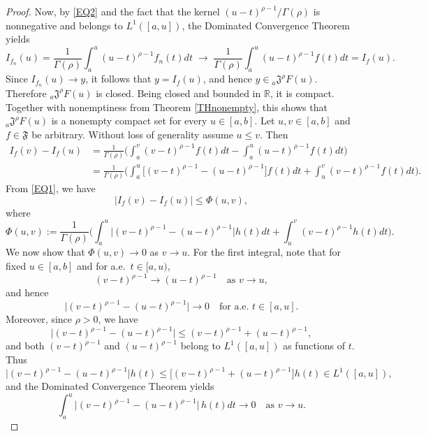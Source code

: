 \documentclass[10pt,a4paper]{amsart}
\begin{document}
\begin{proof}
Now, by \eqref{EQ2} and the fact that the kernel 
$(u-t)^{\rho-1}/\Gamma(\rho)$ is nonnegative and belongs to $L^{1}([a,u])$,
the Dominated Convergence Theorem yields
\[
I_{f_n}(u)
=
\frac{1}{\Gamma(\rho)}\int_{a}^{u}(u-t)^{\rho-1}f_n(t)dt
\;\longrightarrow\;
\frac{1}{\Gamma(\rho)}\int_{a}^{u}(u-t)^{\rho-1}f(t)dt
=
I_f(u).
\]
Since $I_{f_n}(u)\to y$, it follows that $y=I_f(u)$, and hence  $y\in{}_{a}\mathfrak{J}^{\rho}F(u)$.  
Therefore ${}_{a}\mathfrak{J}^{\rho}F(u)$ is closed.  
Being closed and bounded in $\mathbb{R}$, it is compact.  
Together with nonemptiness from Theorem \ref{THnonempty}, this shows that  ${}_{a}\mathfrak{J}^{\rho}F(u)$ is a nonempty compact set for every  $u\in[a,b]$.
Let $u,v\in[a,b]$ and $f\in\mathfrak{F}$ be arbitrary. Without loss of generality assume $u\le v$. Then
\[
\begin{aligned}
I_f(v)-I_f(u)
&=
\frac{1}{\Gamma(\rho)}
\Bigg(
\int_{a}^{v}(v-t)^{\rho-1}f(t)dt
-
\int_{a}^{u}(u-t)^{\rho-1}f(t)dt
\Bigg) \\
&=
\frac{1}{\Gamma(\rho)}
\Bigg(
\int_{a}^{u}\big[(v-t)^{\rho-1}-(u-t)^{\rho-1}\big]f(t)dt
+
\int_{u}^{v}(v-t)^{\rho-1}f(t)dt
\Bigg).
\end{aligned}
\]
From \eqref{EQ1}, we have
$$\big|I_f(v)-I_f(u)\big| \le \Phi(u,v),$$
where
\[
\Phi(u,v) := \frac{1}{\Gamma(\rho)}
\Bigg( \int_{a}^{u}\big|(v-t)^{\rho-1}-(u-t)^{\rho-1}\big|h(t)dt + \int_{u}^{v}(v-t)^{\rho-1}h(t)dt \Bigg).
\]
We now show that $\Phi(u,v)\to 0$ as $v\to u$. For the first integral,
note that for fixed $u\in[a,b]$ and for a.e.~$t\in[a,u)$,
\[ (v-t)^{\rho-1}\to (u-t)^{\rho-1}
\quad\text{as }v\to u, \]
and hence
\[ \big|(v-t)^{\rho-1}-(u-t)^{\rho-1}\big|
\to 0 \quad\text{for a.e. }t\in[a,u]. \] 
 Moreover, since $\rho>0$, we have
\[ \big|(v-t)^{\rho-1}-(u-t)^{\rho-1}\big|
\le (v-t)^{\rho-1}+(u-t)^{\rho-1}, \]
and both $(v-t)^{\rho-1}$ and $(u-t)^{\rho-1}$ belong to $L^{1}([a,u])$ as functions of $t$. Thus
\[ \big|(v-t)^{\rho-1}-(u-t)^{\rho-1}\big|h(t) \le\big[(v-t)^{\rho-1}+(u-t)^{\rho-1}\big]h(t)\in L^{1}([a,u]), \]
and the Dominated Convergence Theorem yields
\[ \int_{a}^{u}\big|(v-t)^{\rho-1}-(u-t)^{\rho-1}\big|\,h(t)dt \longrightarrow 0 \quad\text{as }v\to u. \]


\end{proof}
\end{document}
